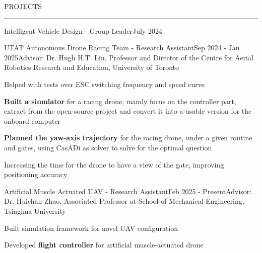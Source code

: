 \documentclass{resume} %
\renewenvironment{rSection}[1]{
\sectionskip
\textcolor{TsinghuaPurple}{\MakeUppercase{#1}}
\sectionlineskip
\hrule
\begin{list}{}{
\setlength{\leftmargin}{0em}
}
\item[]
}{
\end{list}
}
\begin{document}
\begin{rSection}{PROJECTS}
\begin{rSubsection}{Intelligent Vehicle Design - Group Leader}{July 2024}{}{}
\end{rSubsection}

\newpage
\begin{rSubsection}{UTAT Autonomous Drone Racing Team - Research Assistant}{Sep 2024 - Jan 2025}{Advisor: Dr. Hugh H.T. Liu, Professor and Director of the Centre for Aerial Robotics Research and Education, University of Toronto}{}    

\item Helped with tests over ESC switching frequency and speed curve
\item \textbf{Built a simulator} for a racing drone, mainly focus on the controller part, extract from the open-source project and convert it into a usable version for the onboard computer
\item \textbf{Planned the yaw-axis trajectory} for the racing drone, under a given routine and gates, using CasADi as solver to solve for the optimal question
\item Increasing the time for the drone to have a view of the gate, improving positioning accuracy
\end{rSubsection} 


\begin{rSubsection}{Artificial Muscle Actuated UAV - Research Assistant}{Feb 2025 - Present}{Advisor: Dr. Huichan Zhao, Associated Professor at School of Mechanical Engineering, Tsinghua University}{}
    \item Built simulation framework for novel UAV configuration
    \item Developed \textbf{flight controller} for artificial muscle-actuated drone
\end{rSubsection}

\end{rSection} 

\end{document}
